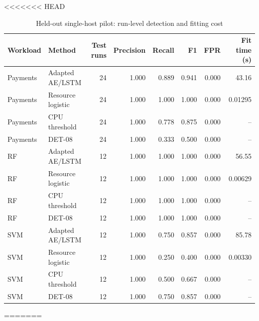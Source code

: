 <<<<<<< HEAD
\begin{table}[t]
\caption{Held-out single-host pilot: run-level detection and fitting cost}
\label{tab:pilot}
\centering\small
\begin{tabular}{llrrrrrr}
\toprule
Workload & Method & Test runs & Precision & Recall & F1 & FPR & Fit time (s) \\
\midrule
Payments & Adapted AE/LSTM & 24 & 1.000 & 0.889 & 0.941 & 0.000 & 43.16 \\
Payments & Resource logistic & 24 & 1.000 & 1.000 & 1.000 & 0.000 & 0.01295 \\
Payments & CPU threshold & 24 & 1.000 & 0.778 & 0.875 & 0.000 & -- \\
Payments & DET-08 & 24 & 1.000 & 0.333 & 0.500 & 0.000 & -- \\
RF & Adapted AE/LSTM & 12 & 1.000 & 1.000 & 1.000 & 0.000 & 56.55 \\
RF & Resource logistic & 12 & 1.000 & 1.000 & 1.000 & 0.000 & 0.00629 \\
RF & CPU threshold & 12 & 1.000 & 1.000 & 1.000 & 0.000 & -- \\
RF & DET-08 & 12 & 1.000 & 1.000 & 1.000 & 0.000 & -- \\
SVM & Adapted AE/LSTM & 12 & 1.000 & 0.750 & 0.857 & 0.000 & 85.78 \\
SVM & Resource logistic & 12 & 1.000 & 0.250 & 0.400 & 0.000 & 0.00330 \\
SVM & CPU threshold & 12 & 1.000 & 0.500 & 0.667 & 0.000 & -- \\
SVM & DET-08 & 12 & 1.000 & 0.750 & 0.857 & 0.000 & -- \\
\bottomrule
\end{tabular}
\end{table}
=======
